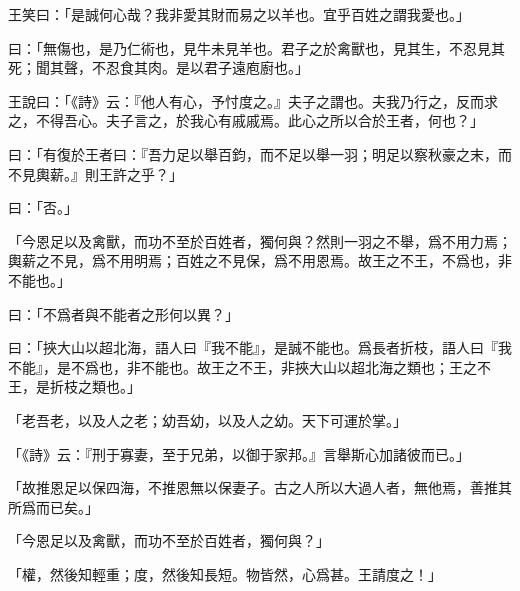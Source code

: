 王笑曰：「是誠何心哉？我非愛其財而易之以羊也。宜乎百姓之謂我愛也。」

曰：「無傷也，是乃仁術也，見牛未見羊也。君子之於禽獸也，見其生，不忍見其死；聞其聲，不忍食其肉。是以君子遠庖廚也。」

王說曰：「《詩》云：『他人有心，予忖度之。』夫子之謂也。夫我乃行之，反而求之，不得吾心。夫子言之，於我心有戚戚焉。此心之所以合於王者，何也？」

曰：「有復於王者曰：『吾力足以舉百鈞，而不足以舉一羽；明足以察秋豪之末，而不見輿薪。』則王許之乎？」

曰：「否。」

「今恩足以及禽獸，而功不至於百姓者，獨何與？然則一羽之不舉，爲不用力焉；輿薪之不見，爲不用明焉；百姓之不見保，爲不用恩焉。故王之不王，不爲也，非不能也。」

曰：「不爲者與不能者之形何以異？」

曰：「挾大山以超北海，語人曰『我不能』，是誠不能也。爲長者折枝，語人曰『我不能』，是不爲也，非不能也。故王之不王，非挾大山以超北海之類也；王之不王，是折枝之類也。」

「老吾老，以及人之老；幼吾幼，以及人之幼。天下可運於掌。」

「《詩》云：『刑于寡妻，至于兄弟，以御于家邦。』言舉斯心加諸彼而已。」

「故推恩足以保四海，不推恩無以保妻子。古之人所以大過人者，無他焉，善推其所爲而已矣。」

「今恩足以及禽獸，而功不至於百姓者，獨何與？」

「權，然後知輕重；度，然後知長短。物皆然，心爲甚。王請度之！」

